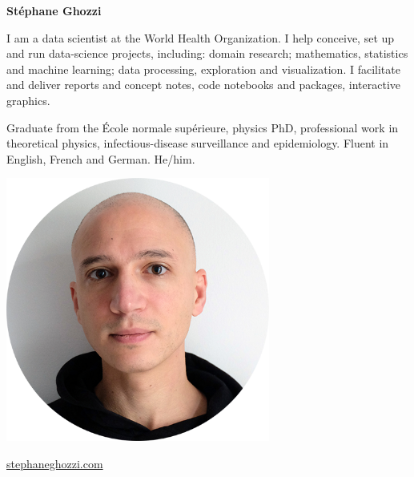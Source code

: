 \documentclass[a4paper,11pt,oneside]{article}
\begin{document}

\noindent\begin{minipage}{0.7\linewidth}
   \LARGE
   \noindent\textbf{Stéphane Ghozzi}

   \normalsize
   \vspace{1.5em}
   \noindent I am a data scientist at the World Health Organization. I help conceive, set up and run data-science projects, including: domain research; mathematics, statistics and machine learning; data processing, exploration and visualization. I facilitate and deliver reports and concept notes, code notebooks and packages, interactive graphics.

   \vspace{1em}

   Graduate from the {\'{E}}cole normale sup{\'{e}}rieure, physics PhD, professional work in theoretical physics, infectious-disease surveillance and epidemiology. Fluent in English, French and German. He/him.
   
\end{minipage}
\begin{minipage}{0.3\linewidth}
   \begin{center}
      \includegraphics[width=0.65\textwidth,right]{GHOZZI-Stephane-portrait-2020-cropped-circle-nobackground-lr.png}
   \end{center}
\end{minipage} 

\vspace{1em}

\href{https://stephaneghozzi.com}{stephaneghozzi.com} \\

\vspace{1em}
\end{document}

